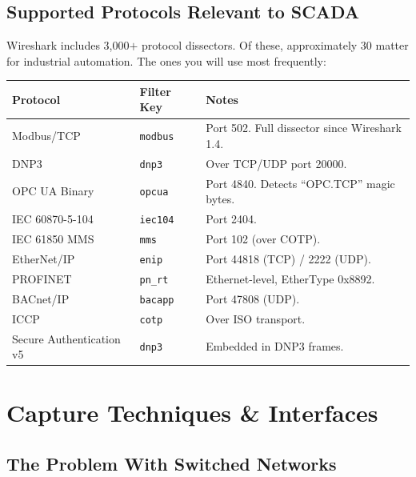 \documentclass[12pt,twoside,openright]{memoir}
\newcommand{\filter}[1]{\texttt{\color{wsblue}#1}}
\begin{document}
\section{Supported Protocols Relevant to SCADA}

Wireshark includes 3,000$+$ protocol dissectors. Of these, approximately 30 matter for industrial automation. The ones you will use most frequently:

\begin{center}
\begin{tabular}{L{3.2cm}L{2.5cm}L{5.5cm}}
\toprule
{}
\textbf{Protocol} & \textbf{Filter Key} & \textbf{Notes} \\
\midrule
Modbus/TCP & \filter{modbus} & Port 502. Full dissector since Wireshark 1.4. \\
DNP3 & \filter{dnp3} & Over TCP/UDP port 20000. \\
OPC UA Binary & \filter{opcua} & Port 4840. Detects ``OPC.TCP'' magic bytes. \\
IEC 60870-5-104 & \filter{iec104} & Port 2404. \\
IEC 61850 MMS & \filter{mms} & Port 102 (over COTP). \\
EtherNet/IP & \filter{enip} & Port 44818 (TCP) / 2222 (UDP). \\
PROFINET & \filter{pn\_rt} & Ethernet-level, EtherType 0x8892. \\
BACnet/IP & \filter{bacapp} & Port 47808 (UDP). \\
ICCP & \filter{cotp} & Over ISO transport. \\
Secure Authentication v5 & \filter{dnp3} & Embedded in DNP3 frames. \\
\bottomrule
\end{tabular}
\end{center}

\chapter{Capture Techniques \& Interfaces}

\section{The Problem With Switched Networks}
\end{document}
